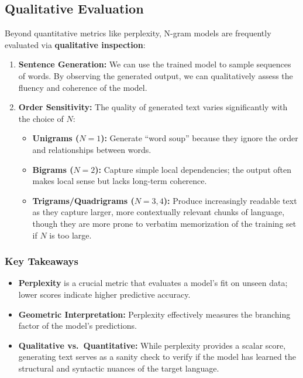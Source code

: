 \documentclass[
  italian,
  11pt,
]{article}
\providecommand{\tightlist}{%
  \setlength{\itemsep}{0pt}\setlength{\parskip}{0pt}}
\begin{document}
\subsection{Qualitative Evaluation}\label{qualitative-evaluation}

Beyond quantitative metrics like perplexity, N-gram models are
frequently evaluated via \textbf{qualitative inspection}:

\begin{enumerate}
\def\labelenumi{\arabic{enumi}.}
\tightlist
\item
  \textbf{Sentence Generation:} We can use the trained model to sample
  sequences of words. By observing the generated output, we can
  qualitatively assess the fluency and coherence of the model.
\item
  \textbf{Order Sensitivity:} The quality of generated text varies
  significantly with the choice of \(N\):

  \begin{itemize}
  \tightlist
  \item
    \textbf{Unigrams (\(N=1\)):} Generate ``word soup'' because they
    ignore the order and relationships between words.
  \item
    \textbf{Bigrams (\(N=2\)):} Capture simple local dependencies; the
    output often makes local sense but lacks long-term coherence.
  \item
    \textbf{Trigrams/Quadrigrams (\(N=3, 4\)):} Produce increasingly
    readable text as they capture larger, more contextually relevant
    chunks of language, though they are more prone to verbatim
    memorization of the training set if \(N\) is too large.
  \end{itemize}
\end{enumerate}

\subsubsection{Key Takeaways}\label{key-takeaways-8}

\begin{itemize}
\tightlist
\item
  \textbf{Perplexity} is a crucial metric that evaluates a model's fit
  on unseen data; lower scores indicate higher predictive accuracy.
\item
  \textbf{Geometric Interpretation:} Perplexity effectively measures the
  branching factor of the model's predictions.
\item
  \textbf{Qualitative vs.~Quantitative:} While perplexity provides a
  scalar score, generating text serves as a sanity check to verify if
  the model has learned the structural and syntactic nuances of the
  target language.
\end{itemize}
\end{document}
